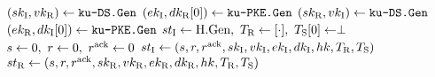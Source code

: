 \algrenewcommand\textproc{}
\algrenewcommand{}

\begin{minipage}{1\linewidth}
  {\fontsize{8}{10}\selectfont

  \begin{algorithmic}[1]
    \State $(sk_\text{I},vk_\text{R}) \gets \texttt{ku-DS.Gen}$
    \State $(ek_\text{I},dk_\text{R}[0]) \gets \texttt{ku-PKE.Gen}$
    \State $(sk_\text{R},vk_\text{I}) \gets \texttt{ku-DS.Gen}$
    \State $(ek_\text{R},dk_\text{I}[0]) \gets \texttt{ku-PKE.Gen}$
    \State $st_\text{I} \gets \text{H.Gen}, \ T_\text{R} \gets [\cdot], \ T_\text{S}[0] \gets \perp$
    \State $s \gets 0, \ r \gets 0, \ r^\text{ack} \gets 0$
    \State $st_\text{I} \gets (s,r,r^\text{ack},sk_\text{I},vk_\text{I},ek_\text{I},dk_\text{I},hk,T_\text{R},T_\text{S})$
    \State $st_\text{R} \gets (s,r,r^\text{ack},sk_\text{R},vk_\text{R},ek_\text{R},dk_\text{R},hk,T_\text{R},T_\text{S})$
    \EndProcedure
  \end{algorithmic}
  }
\end{minipage}